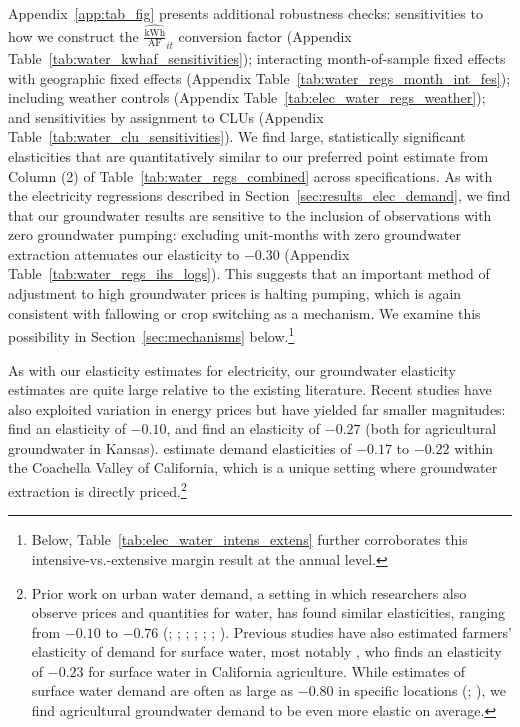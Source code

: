 Appendix~\ref{app:tab_fig} presents additional robustness checks: sensitivities to how we construct the $\widehat{\tfrac{{\text{kWh}}}{\text{AF}}}_{it}$ conversion factor (Appendix Table~\ref{tab:water_kwhaf_sensitivities}); interacting month-of-sample fixed effects with geographic fixed effects (Appendix Table~\ref{tab:water_regs_month_int_fes}); including weather controls (Appendix Table~\ref{tab:elec_water_regs_weather}); and sensitivities by assignment to CLUs (Appendix Table~\ref{tab:water_clu_sensitivities}). We find large, statistically significant elasticities that are quantitatively similar to our preferred point estimate from Column (2) of Table~\ref{tab:water_regs_combined} across specifications. As with the electricity regressions described in Section~\ref{sec:results_elec_demand}, we find that our groundwater results are sensitive to the inclusion of observations with zero groundwater pumping: excluding unit-months with zero groundwater extraction attenuates our elasticity to $-0.30$ (Appendix Table~\ref{tab:water_regs_ihs_logs}). This suggests that an important method of adjustment to high groundwater prices is halting pumping, which is again consistent with fallowing or crop switching as a mechanism. We examine this possibility in Section~\ref{sec:mechanisms} below.\footnote{Below, Table~\ref{tab:elec_water_intens_extens} further corroborates this intensive-vs.-extensive margin result at the annual level.}

As with our elasticity estimates for electricity, our groundwater elasticity estimates are quite large relative to the existing literature. Recent studies have also exploited variation in energy prices but have yielded far smaller magnitudes: \textcite{hendricks2012} find an elasticity of $-0.10$, and \textcite{pfeiffer2014} find an elasticity of $-0.27$ (both for agricultural groundwater in Kansas). \textcite{bruno2018} estimate demand elasticities of $-0.17$ to $-0.22$ within the Coachella Valley of California, which is a unique setting where groundwater extraction is directly priced.\footnote{
Prior work on urban water demand, a setting in which researchers also observe prices and quantities for water, has found similar elasticities, ranging from $-0.10$ to $-0.76$ (\textcite{nataraj2011}; \textcite{ito2013}; \textcite{baerenklau2014}; \textcite{wichman2014}; \textcite{buck2016}; \textcite{wichman2016}; \textcite{hagerty2018}). Previous studies have also estimated farmers' elasticity of demand for surface water, most notably 
\textcite{hagerty2018}, who finds an elasticity of $-0.23$ for surface water in California agriculture. While estimates of surface water demand are often as large as $-0.80$ in specific locations (\textcite{schoengold2006}; \textcite{hagerty2018}), we find agricultural groundwater demand to be even more elastic on average.
}




